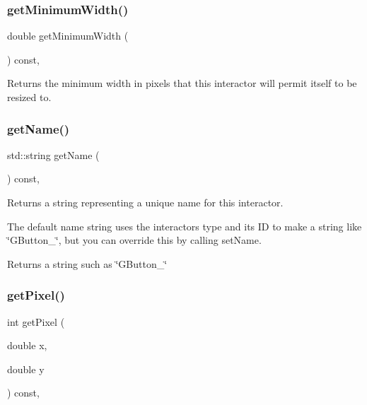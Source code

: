 \subsubsection{\texorpdfstring{get\+Minimum\+Width()}{getMinimumWidth()}}
{\footnotesize\ttfamily double get\+Minimum\+Width (\begin{DoxyParamCaption}{ }\end{DoxyParamCaption}) const\hspace{0.3cm}{\ttfamily [virtual]}, {\ttfamily [inherited]}}



Returns the minimum width in pixels that this interactor will permit itself to be resized to. 

\mbox{\label{classGInteractor_a8a60438a5b55d0b2ceb35c8674b9d8c5}} 
\subsubsection{\texorpdfstring{get\+Name()}{getName()}}
{\footnotesize\ttfamily std\+::string get\+Name (\begin{DoxyParamCaption}{ }\end{DoxyParamCaption}) const\hspace{0.3cm}{\ttfamily [virtual]}, {\ttfamily [inherited]}}



Returns a string representing a unique name for this interactor. 

The default name string uses the interactor\textquotesingle{}s type and its ID to make a string like \char`\"{}\+G\+Button\+\_\char`\"{}, but you can override this by calling set\+Name. \begin{DoxyReturn}{Returns}
a string such as \char`\"{}\+G\+Button\+\_\char`\"{} 
\end{DoxyReturn}
\mbox{\label{classGCanvas_a342aaa6de62a4a324a2e4f3921db1d3e}} 
\subsubsection{\texorpdfstring{get\+Pixel()}{getPixel()}}
{\footnotesize\ttfamily int get\+Pixel (\begin{DoxyParamCaption}\item[{double}]{x,  }\item[{double}]{y }\end{DoxyParamCaption}) const\hspace{0.3cm}{\ttfamily [override]}, {\ttfamily [virtual]}}



